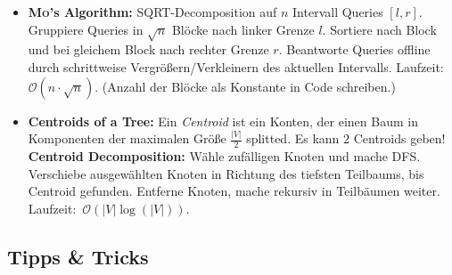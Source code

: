 \begin{itemize}
	\item \textbf{\textsc{Mo}'s Algorithm:}
	SQRT-Decomposition auf $n$ Intervall Queries $[l,r]$.
	Gruppiere Queries in $\sqrt{n}$ Blöcke nach linker Grenze $l$.
	Sortiere nach Block und bei gleichem Block nach rechter Grenze $r$.
	Beantworte Queries offline durch schrittweise Vergrößern/Verkleinern des aktuellen Intervalls.
	Laufzeit:~$\mathcal{O}(n\cdot\sqrt{n})$.
	(Anzahl der Blöcke als Konstante in Code schreiben.)

	\item \textbf{Centroids of a Tree:}
	Ein \emph{Centroid} ist ein Konten, der einen Baum in Komponenten der maximalen Größe $\frac{\vert V \vert}{2}$ splitted.
	Es kann $2$ Centroids geben!
	\textbf{Centroid Decomposition:}
	Wähle zufälligen Knoten und mache DFS.
	Verschiebe ausgewählten Knoten in Richtung des tiefsten Teilbaums, bis Centroid gefunden. Entferne Knoten, mache rekursiv in Teilbäumen weiter. Laufzeit:~$\mathcal{O}(\vert V \vert \log(\vert V \vert))$.
\end{itemize}

\subsection{Tipps \& Tricks}

